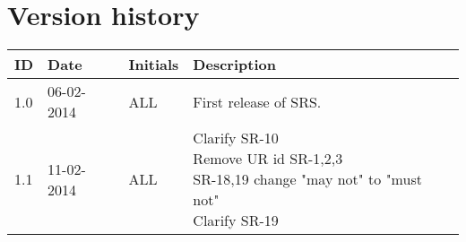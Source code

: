 \documentclass[Main]{subfiles}
\begin{document}
\section*{Version history}

\begin{tabular}{p{} p{} p{} p{}}
\hline
\textbf{ID} & \textbf{Date} & \textbf{Initials} & \textbf{Description}
\\
\hline
1.0 & 06-02-2014 & ALL & First release of SRS.
\\ 
1.1 & 11-02-2014 & ALL & \parbox[t]{0.7\textwidth}{
Clarify SR-10 \\
Remove UR id SR-1,2,3 \\
SR-18,19 change "may not" to "must not" \\
Clarify SR-19\\
}
\\ \hline 
\end{tabular} 
\end{document}
